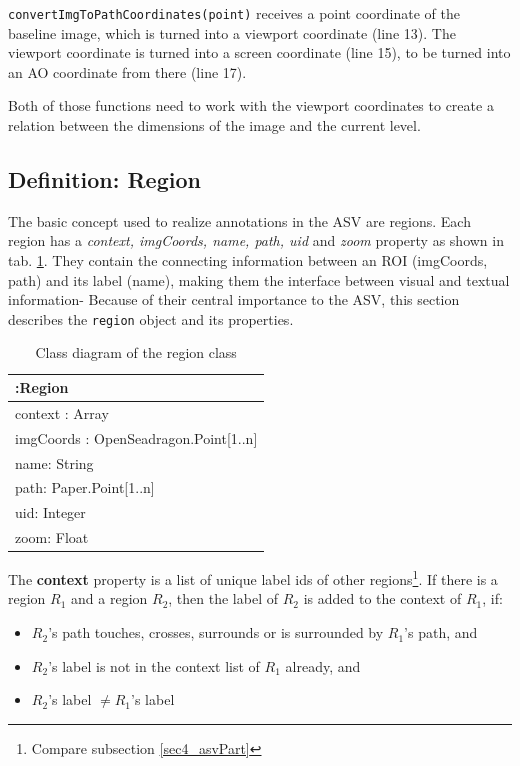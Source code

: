 \texttt{convertImgToPathCoordinates(point)} receives a point coordinate of the baseline image, which is turned into a viewport coordinate (line 13). The viewport coordinate is turned into a screen coordinate (line 15), to be turned into an AO coordinate from there (line 17).

Both of those functions need to work with the viewport coordinates to create a relation between the dimensions of the image and the current level.

\subsection{Definition: Region}
\label{sec4_region}
The basic concept used to realize annotations in the ASV are regions. Each region has a \emph{context, imgCoords, name, path, uid} and \emph{zoom} property as shown in tab. \ref{tab4_regionUML}. They contain the connecting information between an ROI (imgCoords, path) and its label (name), making them the interface between visual and textual information- Because of their central importance to the ASV, this section describes the \texttt{region} object and its properties. 

\begin{table}[H]
	\begin{center}
		\begin{tabular}{| p{7cm} |}
			\hline
			\textbf{:Region} \\ \hline
			context : Array\\
			imgCoords : OpenSeadragon.Point[1..n]\\
			name: String\\
			path: Paper.Point[1..n]\\
			uid: Integer\\
			zoom: Float\\ \hline
		\end{tabular}
		\caption{Class diagram of the region class}
		\label{tab4_regionUML}
	\end{center}
\end{table}

The \textbf{context} property is a list of unique label ids of other regions\footnote{
	Compare subsection \ref{sec4_asvPart}
}. If there is a region $R_1$ and a region $R_2$, then the label of $R_2$ is added to the context of $R_1$, if:
\begin{itemize}
	\item $R_2$'s path touches, crosses, surrounds or is surrounded by $R_1$'s path, and
	\item $R_2$'s label is not in the context list of $R_1$ already, and
	\item $R_2$'s label $\neq R_1$'s label
\end{itemize}

